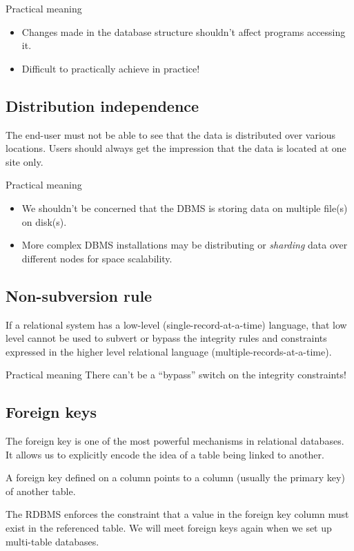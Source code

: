 \documentclass[slides]{pgnotes}
\begin{document}
\begin{greenbox}{Practical meaning}
  \begin{itemize}
  \item Changes made in the database structure shouldn't affect programs accessing it.
  \item Difficult to practically achieve in practice!
  \end{itemize}
\end{greenbox}

  
\subsection{Distribution independence}
The end-user must not be able to see that the data is distributed over various locations. Users should always get the impression that the data is located at one site only.

\begin{greenbox}{Practical meaning}
\begin{itemize}
\item  We shouldn't be concerned that the DBMS is storing data on multiple file(s) on disk(s).
\item  More complex DBMS installations may be distributing or \textit{sharding} data over different nodes for space scalability. 
\end{itemize}
\end{greenbox}


\subsection{Non-subversion rule}
  If a relational system has a low-level (single-record-at-a-time) language, that low level cannot be used to subvert or bypass the integrity rules and constraints expressed in the higher level relational language (multiple-records-at-a-time).

  \begin{greenbox}{Practical meaning}
   There can't be a ``bypass'' switch on the integrity constraints!
  \end{greenbox}

  
\subsection{Foreign keys}

The foreign key is one of the most powerful mechanisms in relational databases.
It allows us to explicitly encode the idea of a table being linked to another.

A foreign key defined on a column points to a column (usually the primary key) of another table.

The RDBMS enforces the constraint that a value in the foreign key column must exist in the referenced table.
We will meet foreign keys again when we set up multi-table databases.
\end{document}
